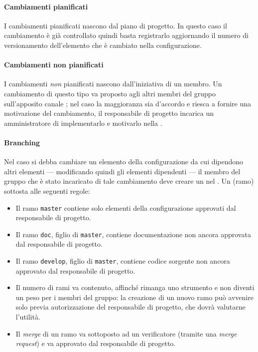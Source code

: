 \paragraph{Cambiamenti pianificati} I cambiamenti pianificati nascono dal piano di progetto. In questo caso il cambiamento è già controllato quindi basta registrarlo aggiornando il numero di versionamento dell'elemento che è cambiato nella configurazione.
\paragraph{Cambiamenti non pianificati} I cambiamenti \emph{non} pianificati nascono dall'iniziativa di un membro. Un cambiamento di questo tipo va proposto agli altri membri del gruppo sull'apposito canale ; nel caso la maggioranza sia d'accordo e riesca a fornire una motivazione del cambiamento, il responsabile di progetto incarica un amministratore di implementarlo e motivarlo nella .
\paragraph{Branching} Nel caso si debba cambiare un elemento della configurazione da cui dipendono altri elementi --- modificando quindi gli elementi dipendenti --- il membro del gruppo che è stato incaricato di tale cambiamento deve creare un  nel . Un  (ramo) sottosta alle seguenti regole:
\begin{itemize}
	\item Il ramo \texttt{master} contiene solo elementi della configurazione approvati dal responsabile di progetto.
	\item Il ramo \texttt{doc}, figlio di \texttt{master}, contiene documentazione non ancora approvata dal responsabile di progetto.
	\item Il ramo \texttt{develop}, figlio di \texttt{master}, contiene codice sorgente non ancora approvato dal responsabile di progetto.
	\item Il numero di rami va contenuto, affinché  rimanga uno strumento e non diventi un peso per i membri del gruppo: la creazione di un nuovo ramo può avvenire solo previa autorizzazione del responsabile di progetto, che dovrà valutarne l'utilità.
	\item Il \emph{merge} di un ramo va sottoposto ad un verificatore (tramite una \emph{merge request}) e va approvato dal responsabile di progetto.
\end{itemize}

